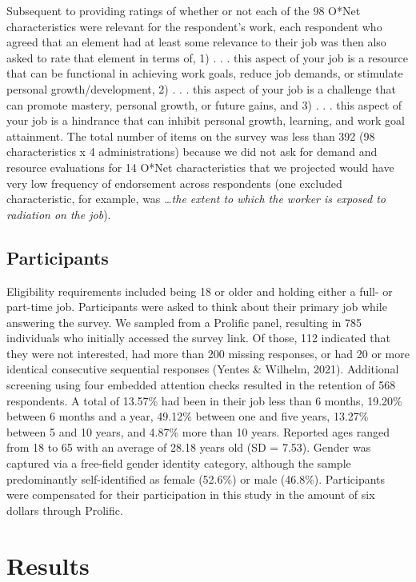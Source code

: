 \documentclass[
  man]{apa6}
\begin{document}
Subsequent to providing ratings of whether or not each of the 98 O*Net characteristics were relevant for the respondent's work, each respondent who agreed that an element had at least some relevance to their job was then also asked to rate that element in terms of, 1) . . . this aspect of your job is a resource that can be functional in achieving work goals, reduce job demands, or stimulate personal growth/development, 2) . . . this aspect of your job is a challenge that can promote mastery, personal growth, or future gains, and 3) . . . this aspect of your job is a hindrance that can inhibit personal growth, learning, and work goal attainment.
The total number of items on the survey was less than 392 (98 characteristics x 4 administrations) because we did not ask for demand and resource evaluations for 14 O*Net characteristics that we projected would have very low frequency of endorsement across respondents (one excluded characteristic, for example, was \emph{\ldots the extent to which the worker is exposed to radiation on the job}).

\hypertarget{participants}{%
\subsection{Participants}\label{participants}}

Eligibility requirements included being 18 or older and holding either a full- or part-time job. Participants were asked to think about their primary job while answering the survey. We sampled from a Prolific panel, resulting in 785 individuals who initially accessed the survey link. Of those, 112 indicated that they were not interested, had more than 200 missing responses, or had 20 or more identical consecutive sequential responses (Yentes \& Wilhelm, 2021). Additional screening using four embedded attention checks resulted in the retention of 568 respondents. A total of 13.57\% had been in their job less than 6 months, 19.20\% between 6 months and a year, 49.12\% between one and five years, 13.27\% between 5 and 10 years, and 4.87\% more than 10 years. Reported ages ranged from 18 to 65 with an average of 28.18 years old (SD = 7.53). Gender was captured via a free-field gender identity category, although the sample predominantly self-identified as female (52.6\%) or male (46.8\%). Participants were compensated for their participation in this study in the amount of six dollars through Prolific.

\hypertarget{results}{%
\section{Results}\label{results}}
\end{document}
